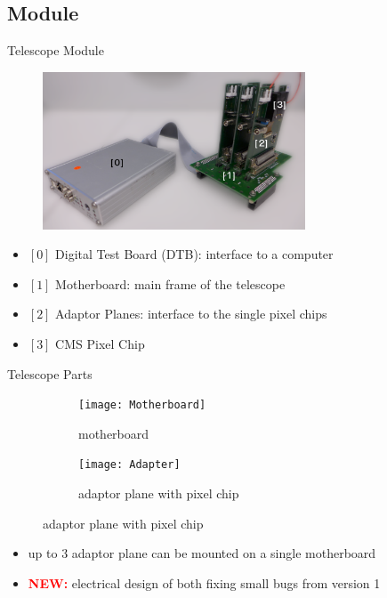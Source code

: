 \subsection{Module}
\begin{frame}{Telescope Module}
	\begin{figure}
		\centering
		\includegraphics[width=7.8cm]{Pics/TelModule}
	\end{figure}
	\begin{itemize}
		\item $[0]$ Digital Test Board (DTB): interface to a computer
		\item $[1]$ Motherboard: main frame of the telescope
		\item $[2]$ Adaptor Planes: interface to the single pixel chips
		\item $[3]$ CMS Pixel Chip
	\end{itemize}
\end{frame}
\begin{frame}{Telescope Parts}
	\begin{figure} 
		\begin{center}
			\begin{subfigure}{0.48\textwidth}  
				\centering 
				\texttt{[image: Motherboard]}
				\caption{motherboard}
			\end{subfigure}
			\begin{subfigure}{0.48\textwidth} 
				\centering 
				\texttt{[image: Adapter]}
				\caption{adaptor plane with pixel chip} 	
			\end{subfigure} 
		\end{center}
	\end{figure}
	\vspace*{5pt}
	\begin{itemize}
		\item up to 3 adaptor plane can be mounted on a single motherboard
		\item \textcolor{red}{\textbf{NEW:}} electrical design of both \ra fixing small bugs from version 1
	\end{itemize}
\end{frame}
